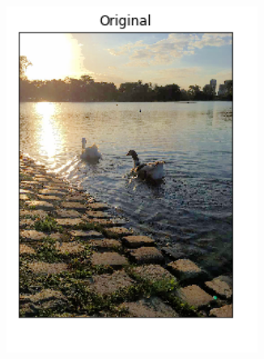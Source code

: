 \documentclass[10pt, a4paper]{article}
\begin{document}
\begin{figure}[H]	
	\centering
    \begin{subfigure}{0.3\textwidth}
        \includegraphics[width=0.9\textwidth]{patitos-alphabetafijos-k4.png}
    \end{subfigure}\hfill
    	\centering
    \begin{subfigure}{0.3\textwidth}

\end{subfigure}
\end{figure}
\end{document}
